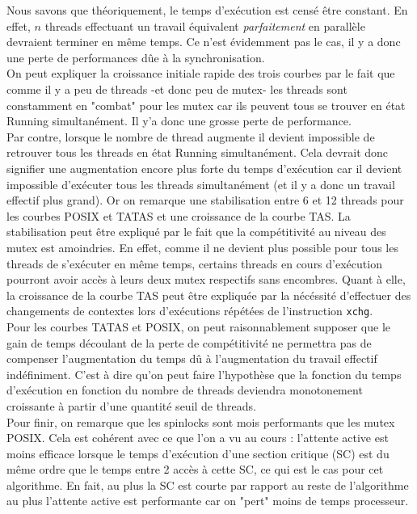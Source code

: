 \noindent Nous savons que théoriquement, le temps d'exécution est censé être constant. En effet, $n$ threads effectuant un travail équivalent \textit{parfaitement} en parallèle devraient terminer en même temps. Ce n'est évidemment pas le cas, il y a donc une perte de performances dûe à la synchronisation.\\

\noindent On peut expliquer la croissance initiale rapide des trois courbes par le fait que comme il y a peu de threads -et donc peu de mutex- les threads sont constamment en "combat" pour les mutex car ils peuvent tous se trouver en état Running simultanément. Il y'a donc une grosse perte de performance.\\

\noindent Par contre, lorsque le nombre de thread augmente il devient impossible de retrouver tous les threads en état Running simultanément. Cela devrait donc signifier une augmentation encore plus forte du temps d'exécution car il devient impossible d'exécuter tous les threads simultanément (et il y a donc un travail effectif plus grand). Or on remarque une stabilisation entre 6 et 12 threads pour les courbes POSIX et TATAS et une croissance de la courbe TAS. La stabilisation peut être expliqué par le fait que la compétitivité au niveau des mutex est amoindries. En effet, comme il ne devient plus possible pour tous les threads de s'exécuter en même temps, certains threads en cours d'exécution pourront avoir accès à leurs deux mutex respectifs sans encombres.
Quant à elle, la croissance de la courbe TAS peut être expliquée par la nécéssité d'effectuer des changements de contextes lors d'exécutions répétées de l'instruction \texttt{xchg}. \\

\noindent Pour les courbes TATAS et POSIX, on peut raisonnablement supposer que le gain de temps découlant de la perte de compétitivité ne permettra pas de compenser l'augmentation du temps dû à l'augmentation du travail effectif indéfiniment. C'est à dire qu'on peut faire l'hypothèse que la fonction du temps d'exécution en fonction du nombre de threads deviendra monotonement croissante à partir d'une quantité seuil de threads.\\

\noindent Pour finir, on remarque que les spinlocks sont mois performants que les mutex POSIX. Cela est cohérent avec ce que l'on a vu au cours : l'attente active est moins efficace lorsque le temps d'exécution d'une section critique (SC) est du même ordre que le temps entre 2 accès à cette SC, ce qui est le cas pour cet algorithme. En fait, au plus la SC est courte par rapport au reste de l'algorithme au plus l'attente active est performante car on "pert" moins de temps processeur.

